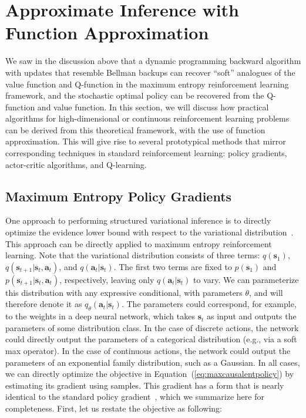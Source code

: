 \section{Approximate Inference with Function Approximation}
\label{sec:deeprl}

We saw in the discussion above that a dynamic programming backward algorithm with updates that resemble Bellman backups can recover ``soft'' analogues of the value function and Q-function in the maximum entropy reinforcement learning framework, and the stochastic optimal policy can be recovered from the Q-function and value function. In this section, we will discuss how practical algorithms for high-dimensional or continuous reinforcement learning problems can be derived from this theoretical framework, with the use of function approximation. This will give rise to several prototypical methods that mirror corresponding techniques in standard reinforcement learning: policy gradients, actor-critic algorithms, and Q-learning.

\subsection{Maximum Entropy Policy Gradients}
\label{sec:maxentpg}

One approach to performing structured variational inference is to directly optimize the evidence lower bound with respect to the variational distribution~\citep{koller_friedman}. This approach can be directly applied to maximum entropy reinforcement learning. Note that the variational distribution consists of three terms: $q(\mathbf{s}_1)$, $q(\mathbf{s}_{t+1}|\mathbf{s}_t,\mathbf{a}_t)$, and $q(\mathbf{a}_t|\mathbf{s}_t)$. The first two terms are fixed to $p(\mathbf{s}_1)$ and $p(\mathbf{s}_{t+1}|\mathbf{s}_t,\mathbf{a}_t)$, respectively, leaving only $q(\mathbf{a}_t|\mathbf{s}_t)$ to vary. We can parameterize this distribution with any expressive conditional, with parameters $\theta$, and will therefore denote it as $q_\theta(\mathbf{a}_t|\mathbf{s}_t)$. The parameters could correspond, for example, to the weights in a deep neural network, which takes $\mathbf{s}_t$ as input and outputs the parameters of some distribution class. In the case of discrete actions, the network could directly output the parameters of a categorical distribution (e.g., via a soft max operator). In the case of continuous actions, the network could output the parameters of an exponential family distribution, such as a Gaussian. In all cases, we can directly optimize the objective in Equation~(\ref{eq:maxcausalentpolicy}) by estimating its gradient using samples. This gradient has a form that is nearly identical to the standard policy gradient~\citep{williams}, which we summarize here for completeness. First, let us restate the objective as following:

